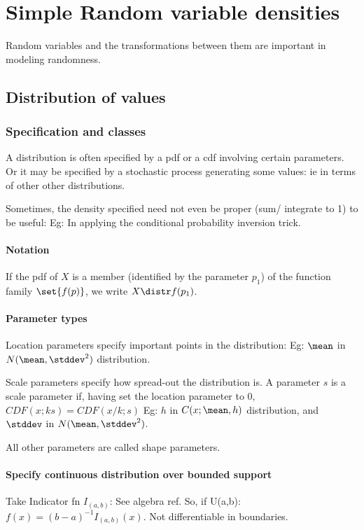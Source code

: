 \documentclass[oneside, article]{memoir}
\begin{document}
\part{Simple Random variable densities}
Random variables and the transformations between them are important in modeling randomness.

\chapter{Distribution of values}
\section{Specification and classes}
A distribution is often specified by a pdf or a cdf involving certain parameters. Or it may be specified by a stochastic process generating some values: ie in terms of other other distributions.

Sometimes, the density specified need not even be proper (sum/ integrate to 1) to be useful: Eg: In applying the conditional probability inversion trick.

\subsection{Notation}
If the pdf of $X$ is a member (identified by the parameter $p_1$) of the function family $\set{f(p)}$, we write $X \distr f(p_1)$.

\subsection{Parameter types}
Location parameters specify important points in the distribution: Eg: $\mean$ in $N(\mean, \stddev^{2})$ distribution.

Scale parameters specify how spread-out the distribution is. A parameter $s$ is a scale parameter if, having set the location parameter to 0, $CDF(x; ks) = CDF(x/k; s)$ Eg: $h$ in $C(x; \mean, h)$ distribution, and $\stddev$ in $N(\mean, \stddev^{2})$.

All other parameters are called shape parameters.

\subsection{Specify continuous distribution over bounded support}
Take Indicator fn $I_{(a,b)}$: See algebra ref. So, if U(a,b): $f(x) = (b-a)^{-1}I_{(a,b)}(x)$. Not differentiable in boundaries.
\end{document}
